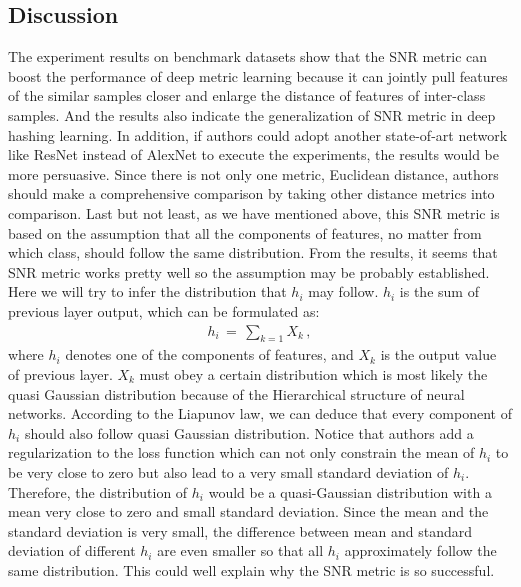 \documentclass[12pt,paper=a4]{scrartcl}
\theoremstyle{break}
\begin{document}
\subsection{Discussion}
The experiment results on benchmark datasets show that the SNR metric can boost the performance of deep metric learning because it can jointly pull features of the similar samples closer and enlarge the distance of features of inter-class samples. And the results also indicate the generalization of SNR metric in deep hashing learning. In addition, if authors could adopt another state-of-art network like ResNet instead of AlexNet to execute the experiments, the results would be more persuasive. Since there is not only one metric, Euclidean distance, authors should make a comprehensive comparison by taking other distance metrics into comparison. Last but not least, as we have mentioned above, this SNR metric is based on the assumption that all the components of features, no matter from which class, should follow the same distribution. From the results, it seems that SNR metric works pretty well so the assumption may be probably established. Here we will try to infer the distribution that $h_i$ may follow. $h_i$ is the sum of previous layer output, which can be formulated as:
\begin{align}
h_i\, =\, \sum_{k=1}X_k\, ,
\end{align}
where $h_i$ denotes one of the components of features, and $X_k$ is the output value of previous layer. $X_k$ must obey a certain distribution which is most likely the quasi Gaussian distribution because of the Hierarchical structure of neural networks. According to the Liapunov law, we can deduce that every component of $h_i$ should also follow quasi Gaussian distribution. Notice that authors add a regularization to the loss function which can not only constrain the mean of $h_i$ to be very close to zero but also lead to a very small standard deviation of $h_i$. Therefore, the distribution of $h_i$ would be a quasi-Gaussian distribution with a mean very close to zero and small standard deviation. Since the mean and the standard deviation is very small, the difference between mean and standard deviation of different $h_i$ are even smaller so that all $h_i$ approximately follow the same distribution. This could well explain why the SNR metric is so successful.
\end{document}
